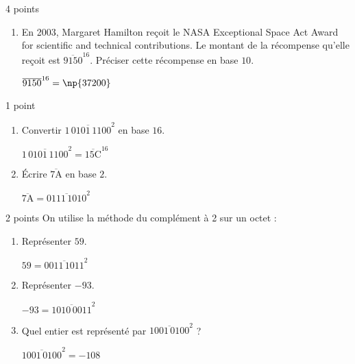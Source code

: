 \documentclass[a4paper,dvipsnames]{article}
\begin{document}
\begin{exercice}{4 points}{}
\begin{enumerate}
    \item En 2003, Margaret Hamilton reçoit le \og{}NASA Exceptional Space Act Award for scientific and technical contributions\fg{}. Le montant de la récompense qu'elle reçoit est $\overline{9150}^{16}$. Préciser cette récompense en base $10$.

      \begin{correction}
	$\overline{9150}^{16}=\np{37200}$
      \end{correction}
      
  \end{enumerate}
\end{exercice}

\medskip

\begin{exercice}{1 point}{}
 \begin{enumerate}
   \item Convertir $\overline{1\,0101\,1100}^2$ en base $16$.

     \begin{correction}
       $\overline{1\,0101\,1100}^2=\overline{15\text{C}}^{16}$
     \end{correction}
     
   \item Écrire $\overline{7\text{A}}$ en base $2$.

     \begin{correction}
       $\overline{7\text{A}}=\overline{0111\,1010}^2$
     \end{correction}
     
 \end{enumerate} 
\end{exercice}

\medskip

\begin{exercice}{2 points}{}
 On utilise la méthode du complément à 2 sur un octet :
 \begin{enumerate}
   \item Représenter $59$.

     \begin{correction}
       $59=\overline{0011\,1011}^2$
     \end{correction}
     
   \item Représenter $-93$. 

     \begin{correction}
       $-93=\overline{1010\,0011}^2$ 
     \end{correction}
     
   \item Quel entier est représenté par $\overline{1001\,0100}^2$ ?

     \begin{correction}
       $\overline{1001\,0100}^2=-108$
     \end{correction}
     
 \end{enumerate}
\end{exercice}
\end{document}
